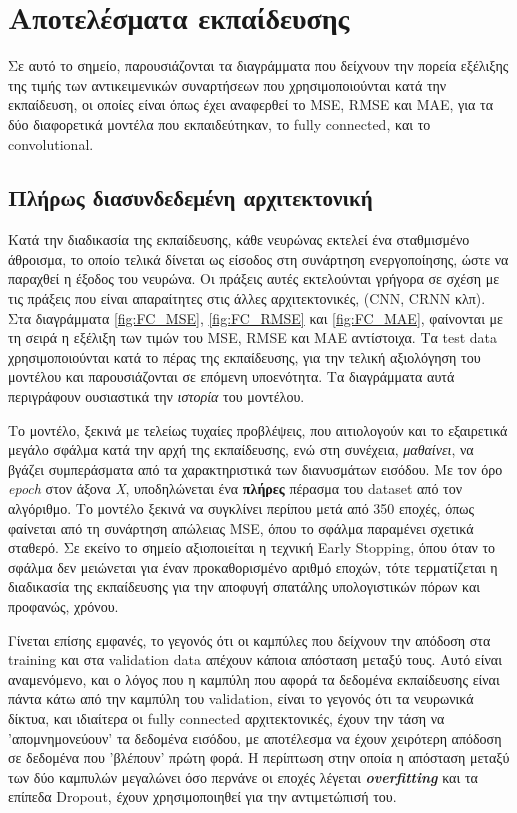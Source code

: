 \section{Αποτελέσματα εκπαίδευσης}
Σε αυτό το σημείο, παρουσιάζονται τα διαγράμματα που δείχνουν την πορεία εξέλιξης της τιμής των αντικειμενικών συναρτήσεων που χρησιμοποιούνται κατά την εκπαίδευση, οι οποίες είναι όπως έχει αναφερθεί το MSE, RMSE και MAE, για τα δύο διαφορετικά μοντέλα που εκπαιδεύτηκαν, το fully connected, και το convolutional.

\subsection{Πλήρως διασυνδεδεμένη αρχιτεκτονική}

Κατά την διαδικασία της εκπαίδευσης, κάθε νευρώνας εκτελεί ένα σταθμισμένο άθροισμα, το οποίο τελικά δίνεται ως είσοδος στη συνάρτηση ενεργοποίησης, ώστε να παραχθεί η έξοδος του νευρώνα. Οι πράξεις αυτές εκτελούνται γρήγορα σε σχέση με τις πράξεις που είναι απαραίτητες στις άλλες αρχιτεκτονικές, (CNN, CRNN κλπ). Στα διαγράμματα \ref{fig:FC_MSE}, \ref{fig:FC_RMSE} και \ref{fig:FC_MAE}, φαίνονται με τη σειρά η εξέλιξη των τιμών του MSE, RMSE και MAE αντίστοιχα. Τα test data χρησιμοποιούνται κατά το πέρας της εκπαίδευσης, για την τελική αξιολόγηση του μοντέλου και παρουσιάζονται σε επόμενη υποενότητα. Τα διαγράμματα αυτά περιγράφουν ουσιαστικά την \textit{ιστορία} του μοντέλου.

Το μοντέλο, ξεκινά με τελείως τυχαίες προβλέψεις, που αιτιολογούν και το εξαιρετικά μεγάλο σφάλμα κατά την αρχή της εκπαίδευσης, ενώ στη συνέχεια, \textit{μαθαίνει}, να βγάζει συμπεράσματα από τα χαρακτηριστικά των διανυσμάτων εισόδου. Με τον όρο \textit{epoch} στον άξονα \textit{Χ}, υποδηλώνεται ένα \textbf{πλήρες} πέρασμα του dataset από τον αλγόριθμο. Το μοντέλο ξεκινά να συγκλίνει περίπου μετά από 350 εποχές, όπως φαίνεται από τη συνάρτηση απώλειας MSE, όπου το σφάλμα παραμένει σχετικά σταθερό. Σε εκείνο το σημείο αξιοποιείται η τεχνική Early Stopping, όπου όταν το σφάλμα δεν μειώνεται για έναν προκαθορισμένο αριθμό εποχών, τότε τερματίζεται η διαδικασία της εκπαίδευσης για την αποφυγή σπατάλης υπολογιστικών πόρων και προφανώς, χρόνου. 

Γίνεται επίσης εμφανές, το γεγονός ότι οι καμπύλες που δείχνουν την απόδοση στα training και στα validation data απέχουν κάποια απόσταση μεταξύ τους. Αυτό είναι αναμενόμενο, και ο λόγος που η καμπύλη που αφορά τα δεδομένα εκπαίδευσης είναι πάντα κάτω από την καμπύλη του validation, είναι το γεγονός ότι τα νευρωνικά δίκτυα, και ιδιαίτερα οι fully connected αρχιτεκτονικές, έχουν την τάση να 'απομνημονεύουν' τα δεδομένα εισόδου, με αποτέλεσμα να έχουν χειρότερη απόδοση σε δεδομένα που 'βλέπουν' πρώτη φορά. Η περίπτωση στην οποία η απόσταση μεταξύ των δύο καμπυλών μεγαλώνει όσο περνάνε οι εποχές λέγεται \textbf{\textit{overfitting}} και τα επίπεδα Dropout, έχουν χρησιμοποιηθεί για την αντιμετώπισή του.


